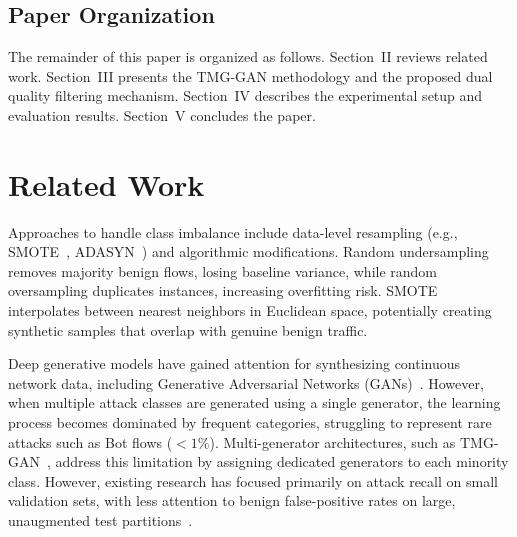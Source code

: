 \documentclass[conference]{IEEEtran}
\begin{document}
\subsection{Paper Organization}

The remainder of this paper is organized as follows. Section~II reviews related work. Section~III presents the TMG-GAN methodology and the proposed dual quality filtering mechanism. Section~IV describes the experimental setup and evaluation results. Section~V concludes the paper.


\section{Related Work}

Approaches to handle class imbalance include data-level resampling (e.g., SMOTE~\cite{chawla2002smote}, ADASYN~\cite{he2008adasyn}) and algorithmic modifications. Random undersampling removes majority benign flows, losing baseline variance, while random oversampling duplicates instances, increasing overfitting risk. SMOTE~\cite{chawla2002smote} interpolates between nearest neighbors in Euclidean space, potentially creating synthetic samples that overlap with genuine benign traffic.

Deep generative models have gained attention for synthesizing continuous network data, including Generative Adversarial Networks (GANs)~\cite{goodfellow2014gan}. However, when multiple attack classes are generated using a single generator, the learning process becomes dominated by frequent categories, struggling to represent rare attacks such as Bot flows ($<1\%$). Multi-generator architectures, such as TMG-GAN~\cite{ding2024tmggan}, address this limitation by assigning dedicated generators to each minority class. However, existing research has focused primarily on attack recall on small validation sets, with less attention to benign false-positive rates on large, unaugmented test partitions~\cite{sommer2010outside,sharafaldin2018toward}.
\end{document}
